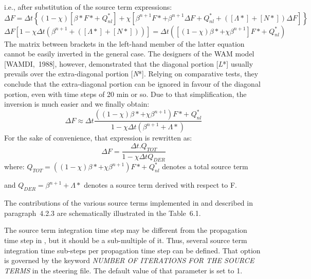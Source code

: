 i.e., after substitution of the source term expressions:
\begin{equation} \label{GrindEQ__6_19_}
\Delta F=\Delta t\left\{\left(1-\chi \right)\left[\beta *F*+\; Q_{nl}^{*} \right]+\chi \left[\beta ^{n+1} F*+\beta ^{n+1} \Delta F+Q_{nl}^{*} +\left(\left[\Lambda *\right]+\left[N*\right]\right)\Delta F\right]\right\}
\end{equation}
\begin{equation} \label{GrindEQ__6_20_}
\Delta F\left[1-\chi \Delta t\left(\beta ^{n+1} +\left(\left[\Lambda *\right]+\left[N*\right]\right)\right)\right]=\Delta t\left(\left[(1-\chi )\beta *+\chi \beta ^{n+1} \right]F*+\; Q_{nl}^{*} \right)
\end{equation}
The matrix between brackets in the left-hand member of the latter equation cannot be easily inverted in the general case. The designers of the WAM model [WAMDI,~1988], however, demonstrated that the diagonal portion [\textit{L}*] usually prevails over the extra-diagonal portion [\textit{N}*]. Relying on comparative tests, they conclude that the extra-diagonal portion can be ignored in favour of the diagonal portion, even with time steps of 20 min or so. Due to that simplification, the inversion is much easier and we finally obtain:
\begin{equation} \label{GrindEQ__6_21_}
\Delta F\approx \Delta t\frac{\left((1-\chi )\beta *+\chi \beta ^{n+1} \right)F*+\; Q_{nl}^{*} }{1-\chi \Delta t\left(\beta ^{n+1} +\Lambda *\right)}
\end{equation}
For the sake of convenience, that expression is rewritten as:
\begin{equation} \label{GrindEQ__6_22_}
\Delta F=\frac{\Delta t.Q_{TOT} }{1-\chi \Delta tQ_{DER} }
\end{equation}
where: $Q_{TOT} =\left((1-\chi )\beta *+\chi \beta ^{n+1} \right)F*+\; Q_{nl}^{*} $ denotes a total source term

 and $Q_{DER} =\beta ^{n+1} +\Lambda *$   denotes a source term derived with respect to F.



 The contributions of the various source terms implemented in \tomawac and described in paragraph~4.2.3 are schematically illustrated in the Table~6.1.

 The source term integration time step may be different from the propagation time step in \tomawac, but it should be a sub-multiple of it. Thus, several source term integration time sub-steps per propagation time step can be defined. That option is governed by the keyword \textit{NUMBER OF ITERATIONS FOR THE SOURCE TERMS} in the steering file. The default value of that parameter is set to 1.

